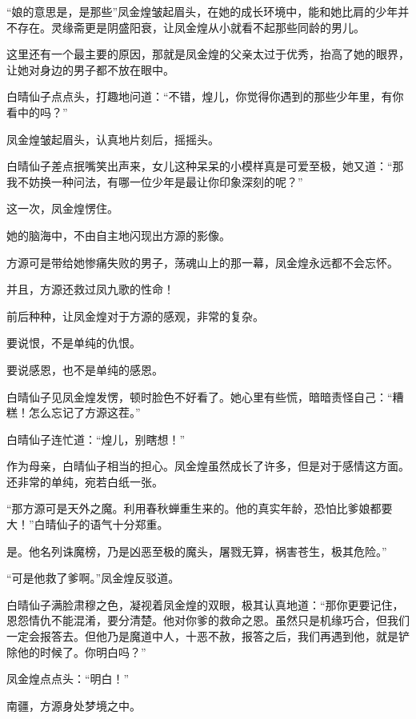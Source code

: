 
\begin{this_body}

“娘的意思是，是那些”凤金煌皱起眉头，在她的成长环境中，能和她比肩的少年并不存在。灵缘斋更是阴盛阳衰，让凤金煌从小就看不起那些同龄的男儿。

这里还有一个最主要的原因，那就是凤金煌的父亲太过于优秀，抬高了她的眼界，让她对身边的男子都不放在眼中。

白晴仙子点点头，打趣地问道：“不错，煌儿，你觉得你遇到的那些少年里，有你看中的吗？”

凤金煌皱起眉头，认真地片刻后，摇摇头。

白晴仙子差点抿嘴笑出声来，女儿这种呆呆的小模样真是可爱至极，她又道：“那我不妨换一种问法，有哪一位少年是最让你印象深刻的呢？”

这一次，凤金煌愣住。

她的脑海中，不由自主地闪现出方源的影像。

方源可是带给她惨痛失败的男子，荡魂山上的那一幕，凤金煌永远都不会忘怀。

并且，方源还救过凤九歌的性命！

前后种种，让凤金煌对于方源的感观，非常的复杂。

要说恨，不是单纯的仇恨。

要说感恩，也不是单纯的感恩。

白晴仙子见凤金煌发愣，顿时脸色不好看了。她心里有些慌，暗暗责怪自己：“糟糕！怎么忘记了方源这茬。”

白晴仙子连忙道：“煌儿，别瞎想！”

作为母亲，白晴仙子相当的担心。凤金煌虽然成长了许多，但是对于感情这方面。还非常的单纯，宛若白纸一张。

“那方源可是天外之魔。利用春秋蝉重生来的。他的真实年龄，恐怕比爹娘都要大！”白晴仙子的语气十分郑重。

是。他名列诛魔榜，乃是凶恶至极的魔头，屠戮无算，祸害苍生，极其危险。”

“可是他救了爹啊。”凤金煌反驳道。

白晴仙子满脸肃穆之色，凝视着凤金煌的双眼，极其认真地道：“那你更要记住，恩怨情仇不能混淆，要分清楚。他对你爹的救命之恩。虽然只是机缘巧合，但我们一定会报答去。但他乃是魔道中人，十恶不赦，报答之后，我们再遇到他，就是铲除他的时候了。你明白吗？”

凤金煌点点头：“明白！”

南疆，方源身处梦境之中。


\end{this_body}
